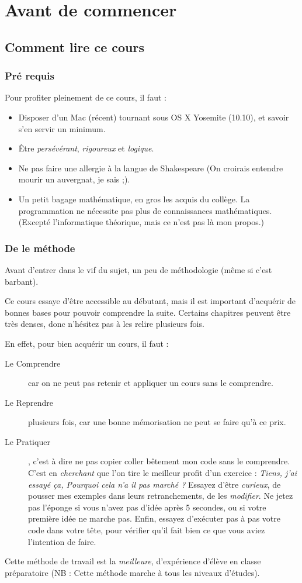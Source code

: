 \chapter{Avant de commencer}

\section{Comment lire ce cours}
\subsection{Pré requis}
Pour profiter pleinement de ce cours, il faut :
\begin{itemize}
\item Disposer d'un Mac (récent) tournant sous OS X Yosemite (10.10),
et savoir s'en servir un minimum.
\item Être \emph{persévérant}, \emph{rigoureux} et \emph{logique}.
\item Ne pas faire une allergie à la langue de Shakespeare
(On croirais entendre mourir un auvergnat, je sais ;).
\item Un petit bagage mathématique, en gros les acquis du collège.
La programmation ne nécessite pas plus de connaissances mathématiques.
(Excepté l'informatique théorique, mais ce n'est pas là mon propos.) 
\end{itemize}

\subsection{De le méthode}
Avant d'entrer dans le vif du sujet,
un peu de méthodologie (même si c'est barbant).


Ce cours essaye d'être accessible au débutant,
mais il est important d'acquérir de bonnes bases
pour pouvoir comprendre la suite.
Certains chapitres peuvent être très denses,
donc n'hésitez pas à les relire plusieurs fois.


En effet, pour bien acquérir un cours, il faut :
\begin{description}
\item[Le Comprendre]
car on ne peut pas retenir et appliquer un cours sans le comprendre.
\item[Le Reprendre] plusieurs fois,
car une bonne mémorisation ne peut se faire qu'à ce prix.
\item[Le Pratiquer],
c'est à dire ne pas copier coller bêtement mon code sans le comprendre.
C'est en \emph{cherchant} que l'on tire le meilleur profit d'un exercice :
\emph{Tiens, j'ai essayé ça, Pourquoi cela n'a il pas marché ?}
Essayez d'être \emph{curieux}, de pousser mes exemples dans leurs retranchements,
de les \emph{modifier}. Ne jetez pas l'éponge si vous n'avez pas d'idée après 5 secondes,
ou si votre première idée ne marche pas.
Enfin, essayez d'exécuter pas à pas votre code dans votre tête,
pour vérifier qu'il fait bien ce que vous aviez l'intention de faire.
\end{description}
Cette méthode de travail est la \emph{meilleure}, d'expérience d'élève en classe préparatoire
(NB : Cette méthode marche à tous les niveaux d'études).
